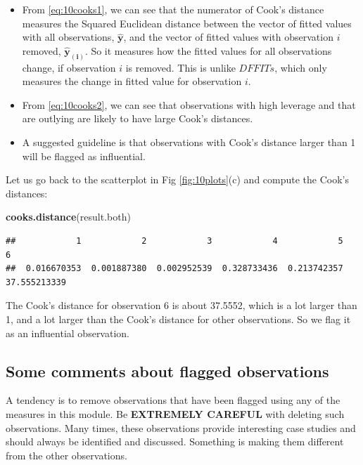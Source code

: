 \documentclass[
]{book}
\newenvironment{Shaded}{\begin{snugshade}}{\end{snugshade}}
\newcommand{\FunctionTok}[1]{\textcolor[rgb]{0.13,0.29,0.53}{\textbf{#1}}}
\newcommand{\NormalTok}[1]{#1}
\begin{document}
\begin{itemize}
\item
  From \eqref{eq:10cooks1}, we can see that the numerator of Cook's distance measures the Squared Euclidean distance between the vector of fitted values with all observations, \(\boldsymbol{\hat{y}}\), and the vector of fitted values with observation \(i\) removed, \(\boldsymbol{\hat{y}_{(i)}}\). So it measures how the fitted values for all observations change, if observation \(i\) is removed. This is unlike \(DFFITs\), which only measures the change in fitted value for observation \(i\).
\item
  From \eqref{eq:10cooks2}, we can see that observations with high leverage and that are outlying are likely to have large Cook's distances.
\item
  A suggested guideline is that observations with Cook's distance larger than 1 will be flagged as influential.
\end{itemize}

Let us go back to the scatterplot in Fig \ref{fig:10plots}(c) and compute the Cook's distances:

\begin{Shaded}
\begin{Highlighting}[]
\FunctionTok{cooks.distance}\NormalTok{(result.both)}
\end{Highlighting}
\end{Shaded}

\begin{verbatim}
##            1            2            3            4            5            6 
##  0.016670353  0.001887380  0.002952539  0.328733436  0.213742357 37.555213339
\end{verbatim}

The Cook's distance for observation 6 is about 37.5552, which is a lot larger than 1, and a lot larger than the Cook's distance for other observations. So we flag it as an influential observation.

\hypertarget{some-comments-about-flagged-observations}{%
\subsection{Some comments about flagged observations}\label{some-comments-about-flagged-observations}}

A tendency is to remove observations that have been flagged using any of the measures in this module. Be \textbf{EXTREMELY CAREFUL} with deleting such observations. Many times, these observations provide interesting case studies and should always be identified and discussed. Something is making them different from the other observations.
\end{document}
